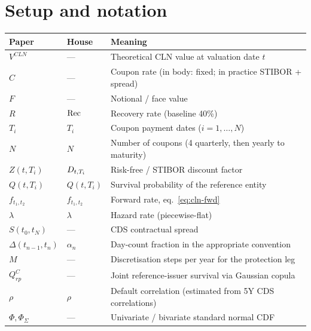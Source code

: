 \documentclass[11pt,a4paper]{article}
\begin{document}
\section{Setup and notation}

\begin{tabular}{@{}p{3cm}p{3.5cm}p{8.5cm}@{}}
\toprule
Paper                  & House                       & Meaning \\
\midrule
$V^{CLN}$              & ---                         & Theoretical CLN value at valuation date $t$ \\
$C$                    & ---                         & Coupon rate (in body: fixed; in practice STIBOR + spread) \\
$F$                    & ---                         & Notional / face value \\
$R$                    & $\mathrm{Rec}$                      & Recovery rate (baseline 40\%) \\
$T_i$                  & $T_i$                       & Coupon payment dates ($i = 1, \ldots, N$) \\
$N$                    & $N$                         & Number of coupons (4 quarterly, then yearly to maturity) \\
$Z(t, T_i)$            & $D_{t,T_i}$             & Risk-free / STIBOR discount factor \\
$Q(t, T_i)$            & $Q(t, T_i)$                 & Survival probability of the reference entity \\
$f_{t_1, t_2}$         & $f_{t_1, t_2}$              & Forward rate, eq.~\ref{eq:cln-fwd} \\
$\lambda$              & $\lambda$                   & Hazard rate (piecewise-flat) \\
$S(t_0, t_N)$          & ---                         & CDS contractual spread \\
$\Delta(t_{n-1}, t_n)$ & $\alpha_n$                  & Day-count fraction in the appropriate convention \\
$M$                    & ---                         & Discretisation steps per year for the protection leg \\
$Q^C_{rp}$             & ---                         & Joint reference-issuer survival via Gaussian copula \\
$\rho$                 & $\rho$                      & Default correlation (estimated from 5Y CDS correlations) \\
$\Phi, \Phi_\Sigma$    & ---                         & Univariate / bivariate standard normal CDF \\
\bottomrule
\end{tabular}
\end{document}
